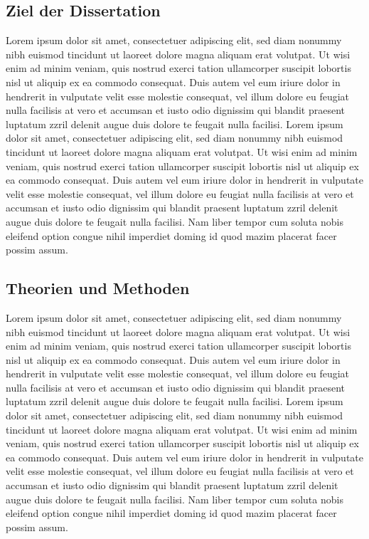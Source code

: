\documentclass[a4paper,bibliography=totocnumbered,12pt]{article}
\begin{document}
\subsection{Ziel der Dissertation}

Lorem ipsum dolor sit amet, consectetuer adipiscing elit, sed diam nonummy nibh euismod tincidunt ut laoreet dolore magna aliquam erat volutpat. Ut wisi enim ad minim veniam, quis nostrud exerci tation ullamcorper suscipit lobortis nisl ut aliquip ex ea commodo consequat. Duis autem vel eum iriure dolor in hendrerit in vulputate velit esse molestie consequat, vel illum dolore eu feugiat nulla facilisis at vero et accumsan et iusto odio dignissim qui blandit praesent luptatum zzril delenit augue duis dolore te feugait nulla facilisi. Lorem ipsum dolor sit amet, consectetuer adipiscing elit, sed diam nonummy nibh euismod tincidunt ut laoreet dolore magna aliquam erat volutpat. Ut wisi enim ad minim veniam, quis nostrud exerci tation ullamcorper suscipit lobortis nisl ut aliquip ex ea commodo consequat. Duis autem vel eum iriure dolor in hendrerit in vulputate velit esse molestie consequat, vel illum dolore eu feugiat nulla facilisis at vero et accumsan et iusto odio dignissim qui blandit praesent luptatum zzril delenit augue duis dolore te feugait nulla facilisi. Nam liber tempor cum soluta nobis eleifend option congue nihil imperdiet doming id quod mazim placerat facer possim assum.

\subsection{Theorien und Methoden}
Lorem ipsum dolor sit amet, consectetuer adipiscing elit, sed diam nonummy nibh euismod tincidunt ut laoreet dolore magna aliquam erat volutpat. Ut wisi enim ad minim veniam, quis nostrud exerci tation ullamcorper suscipit lobortis nisl ut aliquip ex ea commodo consequat. Duis autem vel eum iriure dolor in hendrerit in vulputate velit esse molestie consequat, vel illum dolore eu feugiat nulla facilisis at vero et accumsan et iusto odio dignissim qui blandit praesent luptatum zzril delenit augue duis dolore te feugait nulla facilisi. Lorem ipsum dolor sit amet, consectetuer adipiscing elit, sed diam nonummy nibh euismod tincidunt ut laoreet dolore magna aliquam erat volutpat. Ut wisi enim ad minim veniam, quis nostrud exerci tation ullamcorper suscipit lobortis nisl ut aliquip ex ea commodo consequat. Duis autem vel eum iriure dolor in hendrerit in vulputate velit esse molestie consequat, vel illum dolore eu feugiat nulla facilisis at vero et accumsan et iusto odio dignissim qui blandit praesent luptatum zzril delenit augue duis dolore te feugait nulla facilisi. Nam liber tempor cum soluta nobis eleifend option congue nihil imperdiet doming id quod mazim placerat facer possim assum.
\end{document}
